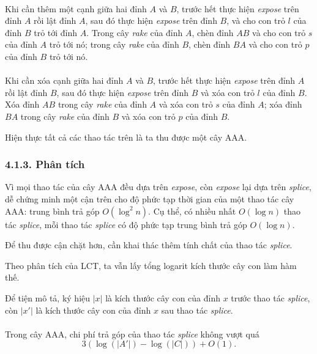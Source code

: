 \documentclass[11pt]{article}
\begin{document}
\paragraph{}
Khi cần thêm một cạnh giữa hai đỉnh \(A\) và \(B\), trước hết thực hiện
\emph{expose} trên đỉnh \(A\) rồi lật đỉnh \(A\), sau đó thực hiện
\emph{expose} trên đỉnh \(B\), và cho con trỏ \(l\) của đỉnh \(B\) trỏ tới
đỉnh \(A\). Trong cây \emph{rake} của đỉnh \(A\), chèn đỉnh \(AB\) và cho con
trỏ \(s\) của đỉnh \(A\) trỏ tới nó; trong cây \emph{rake} của đỉnh \(B\),
chèn đỉnh \(BA\) và cho con trỏ \(p\) của đỉnh \(B\) trỏ tới nó.

\paragraph{}
Khi cần xóa cạnh giữa hai đỉnh \(A\) và \(B\), trước hết thực hiện
\emph{expose} trên đỉnh \(A\) rồi lật đỉnh \(B\), sau đó thực hiện
\emph{expose} trên đỉnh \(B\) và xóa con trỏ \(l\) của đỉnh \(B\). Xóa đỉnh
\(AB\) trong cây \emph{rake} của đỉnh \(A\) và xóa con trỏ \(s\) của đỉnh
\(A\); xóa đỉnh \(BA\) trong cây \emph{rake} của đỉnh \(B\) và xóa con trỏ
\(p\) của đỉnh \(B\).

Hiện thực tất cả các thao tác trên là ta thu được một cây AAA.

\subsubsection*{4.1.3. Phân tích}

Vì mọi thao tác của cây AAA đều dựa trên \emph{expose}, còn \emph{expose} lại
dựa trên \emph{splice}, dễ chứng minh một cận trên cho độ phức tạp thời gian
của một thao tác cây AAA: trung bình trả góp \(O(\log^2 n)\). Cụ thể, có
nhiều nhất \(O(\log n)\) thao tác \emph{splice}, mỗi thao tác \emph{splice}
có độ phức tạp trung bình trả góp \(O(\log n)\).

Để thu được cận chặt hơn, cần khai thác thêm tính chất của thao tác
\emph{splice}.

Theo phân tích của LCT, ta vẫn lấy tổng logarit kích thước cây con làm hàm
thế.

Để tiện mô tả, ký hiệu \(|x|\) là kích thước cây con của đỉnh \(x\) trước
thao tác \emph{splice}, còn \(|x'|\) là kích thước cây con của đỉnh \(x\) sau
thao tác \emph{splice}.

\paragraph{}
Trong cây AAA, chi phí trả góp của thao tác \emph{splice} không vượt quá
\[
  3(\log(|A'|)-\log(|C|))+O(1).
\]
\end{document}
